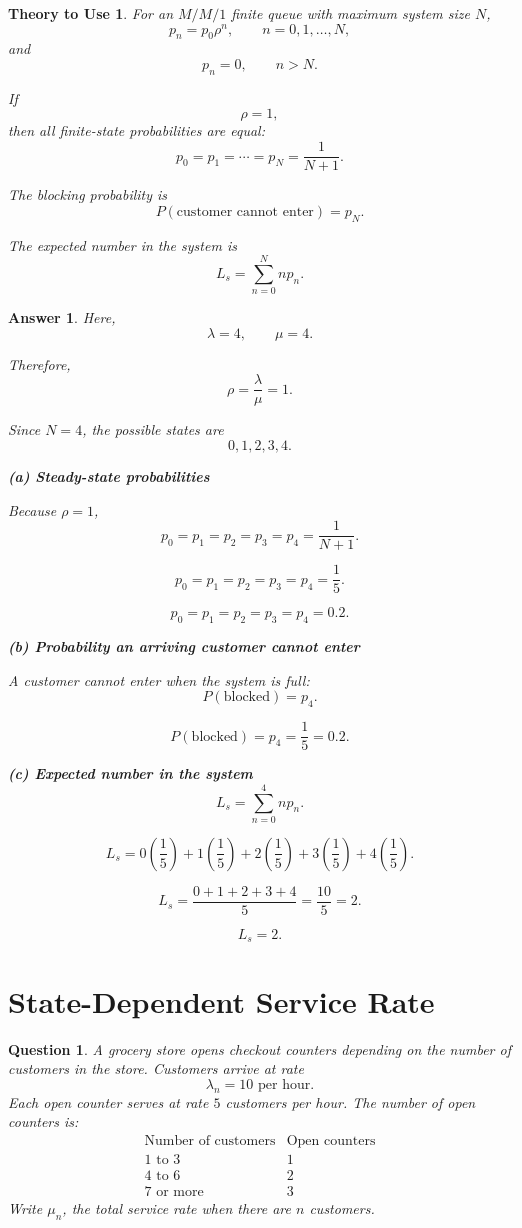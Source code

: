 \documentclass[12pt]{article}
\newtheorem{question}{Question}
\newtheorem*{theory}{Theory to Use}
\newtheorem*{answer}{Answer}
\begin{document}
\begin{theory}
For an \(M/M/1\) finite queue with maximum system size \(N\),
\[
p_n=p_0\rho^n,\qquad n=0,1,\ldots,N,
\]
and
\[
p_n=0,\qquad n>N.
\]

If
\[
\rho=1,
\]
then all finite-state probabilities are equal:
\[
p_0=p_1=\cdots=p_N=\frac{1}{N+1}.
\]

The blocking probability is
\[
P(\text{customer cannot enter})=p_N.
\]

The expected number in the system is
\[
L_s=\sum_{n=0}^{N}np_n.
\]
\end{theory}

\begin{answer}
Here,
\[
\lambda=4,\qquad \mu=4.
\]

Therefore,
\[
\rho=\frac{\lambda}{\mu}=1.
\]

Since \(N=4\), the possible states are
\[
0,1,2,3,4.
\]

\textbf{(a) Steady-state probabilities}

Because \(\rho=1\),
\[
p_0=p_1=p_2=p_3=p_4=\frac{1}{N+1}.
\]

\[
p_0=p_1=p_2=p_3=p_4=\frac{1}{5}.
\]

\[
\boxed{p_0=p_1=p_2=p_3=p_4=0.2.}
\]

\textbf{(b) Probability an arriving customer cannot enter}

A customer cannot enter when the system is full:
\[
P(\text{blocked})=p_4.
\]

\[
\boxed{P(\text{blocked})=p_4=\frac{1}{5}=0.2.}
\]

\textbf{(c) Expected number in the system}
\[
L_s=\sum_{n=0}^{4}np_n.
\]

\[
L_s=0\left(\frac{1}{5}\right)
+1\left(\frac{1}{5}\right)
+2\left(\frac{1}{5}\right)
+3\left(\frac{1}{5}\right)
+4\left(\frac{1}{5}\right).
\]

\[
L_s=\frac{0+1+2+3+4}{5}
=\frac{10}{5}=2.
\]

\[
\boxed{L_s=2.}
\]
\end{answer}

\section{State-Dependent Service Rate}

\begin{question}
A grocery store opens checkout counters depending on the number of customers in the store.
Customers arrive at rate
\[
\lambda_n=10\text{ per hour}.
\]
Each open counter serves at rate \(5\) customers per hour.
The number of open counters is:
\[
\begin{array}{c|c}
\text{Number of customers} & \text{Open counters}\\
\hline
1\text{ to }3 & 1\\
4\text{ to }6 & 2\\
7\text{ or more} & 3
\end{array}
\]
Write \(\mu_n\), the total service rate when there are \(n\) customers.
\end{question}
\end{document}
